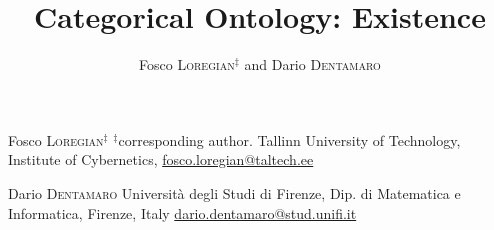 \documentclass[a4paper,9pt]{../birkjour}
\title{Categorical Ontology: Existence}
\author{Fosco \textsc{Loregian}$^\ddag$ and Dario \textsc{Dentamaro}}
\begin{document}
\scriptsize

\maketitle

\begin{minipage}{.4\textwidth}
  Fosco \textsc{Loregian}$^\ddag$\newline 
  $^\ddag$corresponding author. \newline 
Tallinn University of Technology,\newline %
Institute of Cybernetics,\newline 
\url{fosco.loregian@taltech.ee}
\end{minipage}\hfill %
\begin{minipage}{.4\textwidth}
  Dario \textsc{Dentamaro} \newline 
  Università degli Studi di Firenze,\newline 
  Dip. di Matematica e Informatica, \newline 
  Firenze, Italy\newline
  \url{dario.dentamaro@stud.unifi.it}
\end{minipage}
\end{document}
